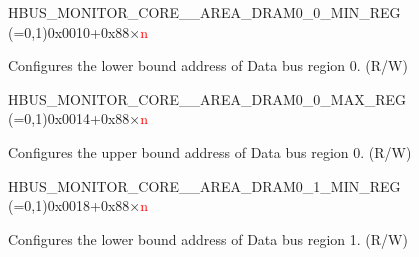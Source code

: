 \begin{register}{H}{BUS\_MONITOR\_CORE\_\_AREA\_DRAM0\_0\_MIN\_REG (=0,1)}{0x0010+0x88×\textcolor{red}{n}}\label{regdesc:BUSMONITORCORE0AREADRAM00MINREG}
%
\regnewline%
\begin{regdesc}\begin{reglist}
\label{fielddesc:BUSMONITORCORE0AREADRAM00MIN}\item [BUS\_MONITOR\_CORE\_\regindex{n}\_AREA\_DRAM0\_0\_MIN] Configures the lower bound address of Data bus region 0. (R/W)
\end{reglist}\end{regdesc}
\end{register}


\begin{register}{H}{BUS\_MONITOR\_CORE\_\_AREA\_DRAM0\_0\_MAX\_REG (=0,1)}{0x0014+0x88×\textcolor{red}{n}}\label{regdesc:BUSMONITORCORE0AREADRAM00MAXREG}
%
\regnewline%
\begin{regdesc}\begin{reglist}
\label{fielddesc:BUSMONITORCORE0AREADRAM00MAX}\item [BUS\_MONITOR\_CORE\_\regindex{n}\_AREA\_DRAM0\_0\_MAX] Configures the upper bound address of Data bus region 0. (R/W)
\end{reglist}\end{regdesc}
\end{register}


\begin{register}{H}{BUS\_MONITOR\_CORE\_\_AREA\_DRAM0\_1\_MIN\_REG (=0,1)}{0x0018+0x88×\textcolor{red}{n}}\label{regdesc:BUSMONITORCORE0AREADRAM01MINREG}
%
\regnewline%
\begin{regdesc}\begin{reglist}
\label{fielddesc:BUSMONITORCORE0AREADRAM01MIN}\item [BUS\_MONITOR\_CORE\_\regindex{n}\_AREA\_DRAM0\_1\_MIN] Configures the lower bound address of Data bus region 1. (R/W)
\end{reglist}\end{regdesc}
\end{register}


